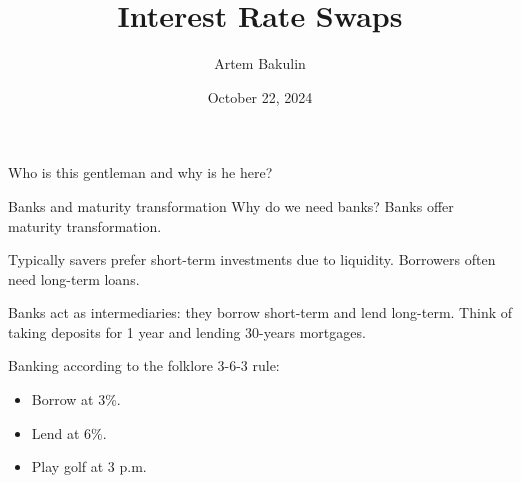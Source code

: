 \documentclass{beamer}
\title{Interest Rate Swaps}
\author{Artem Bakulin}
\date{October 22, 2024}
\begin{document}
\begin{frame}
\titlepage
\end{frame}



\begin{frame}{Who is this gentleman and why is he here?}
\centering
{}
\end{frame}



\begin{frame}{Banks and maturity transformation}
\justify
Why do we need banks? Banks offer \alert{maturity transformation}.

\justify
Typically savers prefer short-term investments due to liquidity.  Borrowers often need long-term loans.

\justify
Banks act as intermediaries: they borrow short-term and lend long-term. Think of taking deposits for 1 year and lending 30-years mortgages.

\justify
Banking according to the folklore 3-6-3 rule:
\begin{itemize}
\item Borrow at 3\%.
\item Lend at 6\%.
\item Play golf at 3 p.m.
\end{itemize}
\end{frame}
\end{document}
